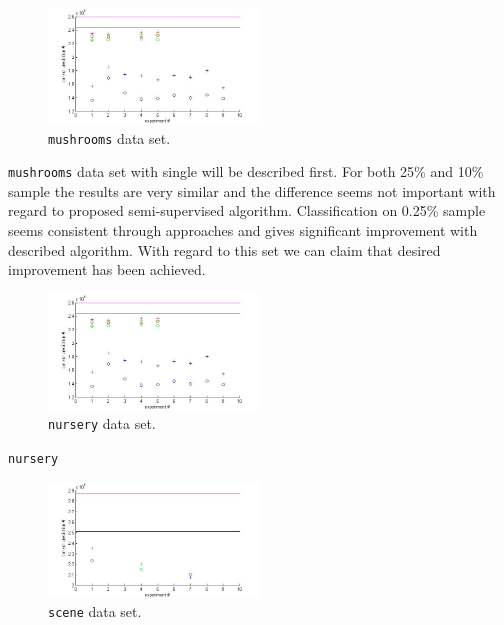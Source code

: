 \documentclass[12pt, a4paper, pdflatex]{report}
\begin{document}
\begin{figure}[htbp]
	\centering
	\includegraphics[width=0.5\textwidth]{graphics/figures/fig1.jpg}
	\begin{tiny}
		\caption{\small \texttt{mushrooms} data set.\label{img:mushrooms}}
	\end{tiny}
\end{figure}
\texttt{mushrooms} data set with single  will be described first. For both 25\% and 10\% sample the results are very similar and the difference seems not important with regard to proposed semi-supervised algorithm. Classification on 0.25\% sample seems consistent through approaches and gives significant improvement with described algorithm. With regard to this set we can claim that desired improvement has been achieved.\\


\begin{figure}[htbp]
	\centering
	\includegraphics[width=0.5\textwidth]{graphics/figures/fig2.jpg}
	\begin{tiny}
		\caption{\small \texttt{nursery} data set.\label{img:nursery}}
	\end{tiny}
\end{figure}

\texttt{nursery}

\begin{figure}[htbp]
	\centering
	\includegraphics[width=0.5\textwidth]{graphics/figures/fig3.jpg}
	\begin{tiny}
		\caption{\small \texttt{scene} data set.\label{img:scene}}
	\end{tiny}
\end{figure}
\end{document}
